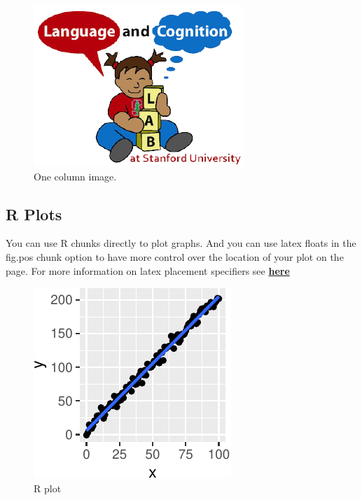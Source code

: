 \documentclass[10pt, letterpaper]{article}
\newenvironment{CodeChunk}{}{}
\begin{document}
\begin{CodeChunk}
\begin{figure}[H]

{\centering \includegraphics{figs/image-1} 

}

\caption[One column image]{One column image.}\label{fig:image}
\end{figure}
\end{CodeChunk}

\subsection{R Plots}\label{r-plots}

You can use R chunks directly to plot graphs. And you can use latex
floats in the fig.pos chunk option to have more control over the
location of your plot on the page. For more information on latex
placement specifiers see
\textbf{\href{https://en.wikibooks.org/wiki/LaTeX/Floats,_Figures_and_Captions}{here}}

\begin{CodeChunk}
\begin{figure}[H]

{\centering \includegraphics{figs/plot-1} 

}

\caption[R plot]{R plot}\label{fig:plot}
\end{figure}
\end{CodeChunk}
\end{document}
